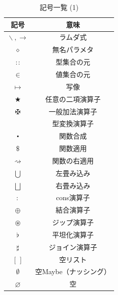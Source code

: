\documentclass[a5paper,twoside,fleqn]{jsbook}
\newcommand{\mEmptyList}{{[\,]}}
\newcommand{\mNothing}{\emptyset}
\newcommand{\mPureNothing}{\varnothing}
\newcommand{\mAnonParam}{\diamond}
\newcommand{\mUpCast}{\bigtriangleup}
\DeclareMathOperator{\mFromIntegral}{\mUpCast_\text{Integral}}
\DeclareMathOperator{\mAppend}{\oplus}
\DeclareMathOperator{\mApply}{\$}
\DeclareMathOperator{\mApplyRight}{\rightsquigarrow}
\DeclareMathOperator{\mBinOp}{\bigstar}
\DeclareMathOperator{\mComp}{\centerdot}
\DeclareMathOperator{\mConcat}{\flat}
\DeclareMathOperator{\mCons}{:}
\DeclareMathOperator*{\mFold}{\bigcup}
\DeclareMathOperator*{\mFoldRight}{\bigsqcup}
\DeclareMathOperator{\mIn}{{:\!:}}
\DeclareMathOperator{\mJoin}{\sharp}
\DeclareMathOperator{\mLambda}{\backslash}
\DeclareMathOperator{\mLambdaArrow}{\rightarrow}
\DeclareMathOperator{\mMapsTo}{\mapsto}
\DeclareMathOperator{\mPlus}{\maltese}
\DeclareMathOperator{\mZip}{\circledast}
\begin{document}
\begin{table}[p]
\caption{記号一覧 (1)}
\begin{center}
\begin{tabular}{||c|c||}
\hline
記号&意味\\
\hline\hline
$\mLambda, \mLambdaArrow$&ラムダ式\\
$\mAnonParam$&無名パラメタ\\
\hline
$\mIn$&型集合の元\\
$\in$&値集合の元\\
$\mMapsTo$&写像\\
\hline
$\mBinOp$&任意の二項演算子\\
$\mPlus$&一般加法演算子\\
\hline
$\mFromIntegral$&型変換演算子\\
\hline
$\mComp$&関数合成\\
$\mApply$&関数適用\\
$\mApplyRight$&関数の右適用\\
\hline
$\mFold$&左畳み込み\\
$\mFoldRight$&右畳み込み\\
\hline
$\mCons$&cons演算子\\
$\mAppend$&結合演算子\\
$\mZip$&ジップ演算子\\
$\mConcat$&平坦化演算子\\
$\mJoin$&ジョイン演算子\\
\hline
$\mEmptyList$&空リスト\\
$\mNothing$&空Maybe（ナッシング）\\
$\mPureNothing$&空\\
\hline
\end{tabular}
\end{center}
\end{table}
\end{document}
